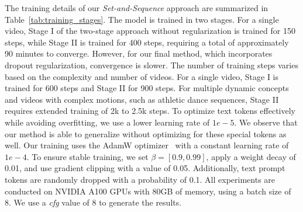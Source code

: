 

The training details of our \textit{Set-and-Sequence} approach are summarized in Table~\ref{tab:training_stages}. The model is trained in two stages. For a single video, Stage I of the two-stage approach without regularization is trained for 150 steps, while Stage II is trained for 400 steps, requiring a total of approximately 90 minutes to converge. However, for our final method, which incorporates dropout regularization, convergence is slower. The number of training steps varies based on the complexity and number of videos. For a single video, Stage I is trained for 600 steps and Stage II for 900 steps. For multiple dynamic concepts and videos with complex motions, such as athletic dance sequences, Stage II requires extended training of 2k to 2.5k steps. To optimize text tokens effectively while avoiding overfitting, we use a lower learning rate of $1e-5$. We observe that our method is able to generalize without optimizing for these special tokens as well. Our training uses the AdamW optimizer~\cite{loshchilov2018decoupled} with a constant learning rate of $1e-4$. To ensure stable training, we set $\beta = [0.9, 0.99]$, apply a weight decay of 0.01, and use gradient clipping with a value of 0.05. Additionally, text prompt tokens are randomly dropped with a probability of 0.1. All experiments are conducted on NVIDIA A100 GPUs with 80GB of memory, using a batch size of 8. We use a  \textit{cfg} value of 8 to generate the results.


